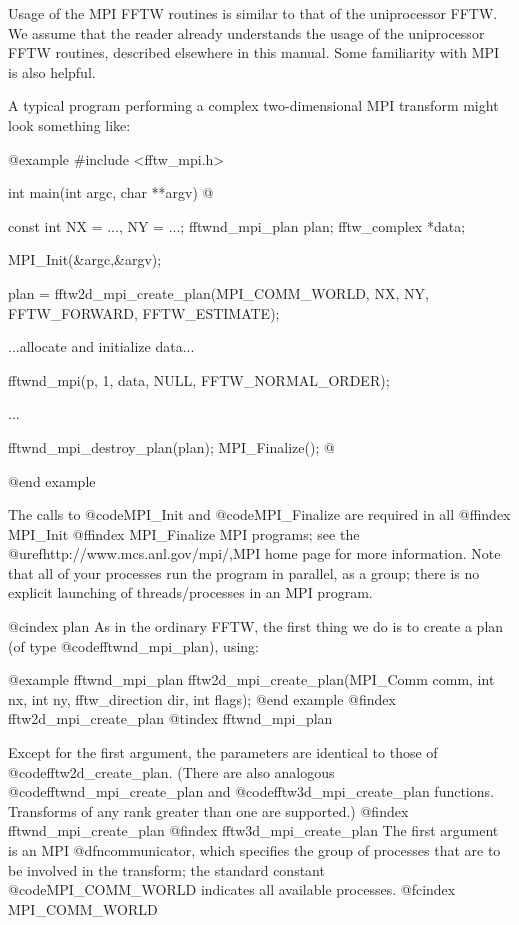 Usage of the MPI FFTW routines is similar to that of the uniprocessor
FFTW.  We assume that the reader already understands the usage of the
uniprocessor FFTW routines, described elsewhere in this manual.  Some
familiarity with MPI is also helpful.

A typical program performing a complex two-dimensional MPI transform
might look something like:

@example
#include <fftw_mpi.h>

int main(int argc, char **argv)
@{
      const int NX = ..., NY = ...;
      fftwnd_mpi_plan plan;
      fftw_complex *data;

      MPI_Init(&argc,&argv);

      plan = fftw2d_mpi_create_plan(MPI_COMM_WORLD,
                                    NX, NY,
                                    FFTW_FORWARD, FFTW_ESTIMATE);

      ...allocate and initialize data...

      fftwnd_mpi(p, 1, data, NULL, FFTW_NORMAL_ORDER);

      ...

      fftwnd_mpi_destroy_plan(plan);
      MPI_Finalize();
@}
@end example

The calls to @code{MPI_Init} and @code{MPI_Finalize} are required in all
@ffindex MPI_Init
@ffindex MPI_Finalize
MPI programs; see the @uref{http://www.mcs.anl.gov/mpi/,MPI home page}
for more information.  Note that all of your processes run the program
in parallel, as a group; there is no explicit launching of
threads/processes in an MPI program.

@cindex plan
As in the ordinary FFTW, the first thing we do is to create a plan (of
type @code{fftwnd_mpi_plan}), using:

@example
fftwnd_mpi_plan fftw2d_mpi_create_plan(MPI_Comm comm,
                                       int nx, int ny,
                                       fftw_direction dir, int flags);
@end example
@findex fftw2d_mpi_create_plan
@tindex fftwnd_mpi_plan

Except for the first argument, the parameters are identical to those of
@code{fftw2d_create_plan}.  (There are also analogous
@code{fftwnd_mpi_create_plan} and @code{fftw3d_mpi_create_plan}
functions.  Transforms of any rank greater than one are supported.)
@findex fftwnd_mpi_create_plan
@findex fftw3d_mpi_create_plan
The first argument is an MPI @dfn{communicator}, which specifies the
group of processes that are to be involved in the transform; the
standard constant @code{MPI_COMM_WORLD} indicates all available
processes.
@fcindex MPI_COMM_WORLD

